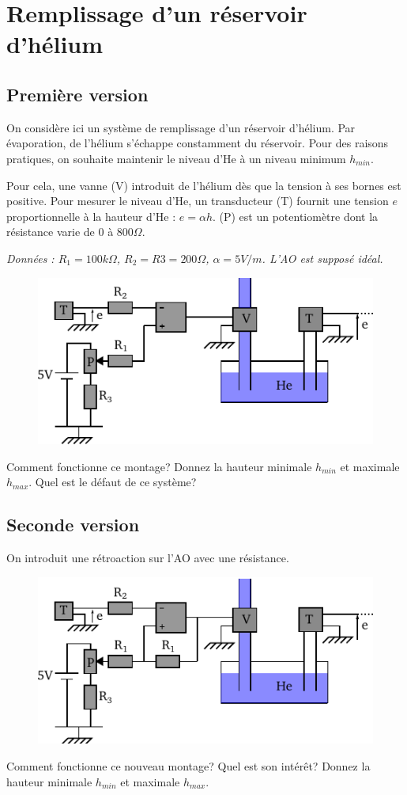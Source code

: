 \documentclass{report}
\begin{document}
\newpage

\section*{Remplissage d'un réservoir d'hélium}
\subsection*{Première version}
On considère ici un système de remplissage d'un réservoir d'hélium. Par évaporation, de l'hélium s'échappe constamment du réservoir. Pour des raisons pratiques, on souhaite maintenir le niveau d'He à un niveau minimum $h_{min}$.

Pour cela, une vanne (V) introduit de l'hélium dès que la tension à ses bornes est positive. Pour mesurer le niveau d'He, un transducteur (T) fournit une tension $e$ proportionnelle à la hauteur d'He : $e= \alpha h$. (P) est un potentiomètre dont la résistance varie de $0$ à $800\Omega$.

\textit{Données : $R_{1} = 100k\Omega$, $R_{2}=R{3}=200\Omega$, $\alpha = 5V/m$. L'AO est supposé idéal.}

\begin{figure}[!h]
\centering
\includegraphics[width=0.8\linewidth]{circuit_10.pdf}
\end{figure}

Comment fonctionne ce montage? Donnez la hauteur minimale $h_{min}$ et maximale $h_{max}$. Quel est le défaut de ce système?

\subsection*{Seconde version}
On introduit une rétroaction sur l'AO avec une résistance.

\begin{figure}[!h]
\centering
\includegraphics[width=0.8\linewidth]{circuit_11.pdf}
\end{figure}

Comment fonctionne ce nouveau montage? Quel est son intérêt? Donnez la hauteur minimale $h_{min}$ et maximale $h_{max}$.
\end{document}
